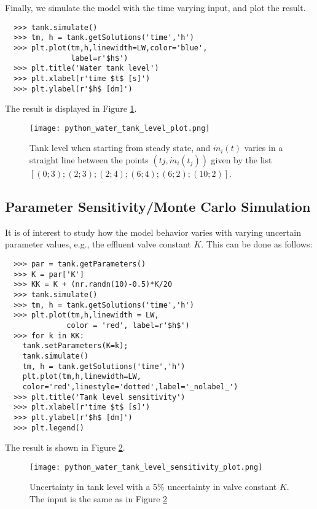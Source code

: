 Finally, we simulate the model with the time varying input, and plot the result.

\begin{lstlisting}
  >>> tank.simulate()
  >>> tm, h = tank.getSolutions('time','h')
  >>> plt.plot(tm,h,linewidth=LW,color='blue',
               label=r'$h$')
  >>> plt.title('Water tank level')
  >>> plt.xlabel(r'time $t$ [s]')
  >>> plt.ylabel(r'$h$ [dm]')
\end{lstlisting}

The result is displayed in Figure \ref{fig:pythonwatertanklevelsensitivityplot}.

\begin{figure} [!h]
	\texttt{[image: python\_water\_tank\_level\_plot.png]}
	\caption{Tank level when starting from steady state, and $\dot{m}_i(t)$ varies in a straight line between the points $(tj,\dot{m}_i(t_j ))$
		given by the list $[(0; 3); (2; 3); (2; 4); (6; 4); (6; 2); (10; 2)]$.}
	\label{fig:pythonwatertanklevelsensitivityplot}
\end{figure}

\subsection{Parameter Sensitivity/Monte Carlo Simulation}
\label{subsec:pythonparametersensitivity}

It is of interest to study how the model behavior varies with varying uncertain parameter values, e.g., the effluent
valve constant $K$. This can be done as follows:

\begin{lstlisting}
  >>> par = tank.getParameters()
  >>> K = par['K']
  >>> KK = K + (nr.randn(10)-0.5)*K/20
  >>> tank.simulate()
  >>> tm, h = tank.getSolutions('time','h')
  >>> plt.plot(tm,h,linewidth = LW,
              color = 'red', label=r'$h$')
  >>> for k in KK:
    tank.setParameters(K=k);
    tank.simulate()
    tm, h = tank.getSolutions('time','h')
    plt.plot(tm,h,linewidth=LW,
    color='red',linestyle='dotted',label='_nolabel_')
  >>> plt.title('Tank level sensitivity')
  >>> plt.xlabel(r'time $t$ [s]')
  >>> plt.ylabel(r'$h$ [dm]')
  >>> plt.legend()
\end{lstlisting}

The result is shown in Figure \ref{fig:pythonwatertanklevelplot}.

\begin{figure} [!h]
	\texttt{[image: python\_water\_tank\_level\_sensitivity\_plot.png]}
	\caption{Uncertainty in tank level with a 5\% uncertainty in valve constant $K$. The input is the same as in Figure \ref{fig:pythonwatertanklevelplot}}
	\label{fig:pythonwatertanklevelplot}
\end{figure}

